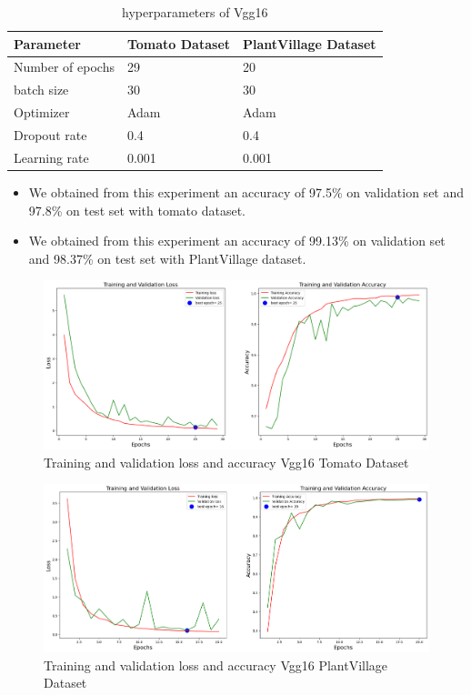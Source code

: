 \begin{table}[H]
\begin{tabular}{@{}|p{9cm}|p{3cm}|p{3cm}|@{}}
\hline
 \centering \textbf{Parameter} & \textbf{Tomato Dataset} & \textbf{PlantVillage Dataset} \\ \hline
 Number of epochs & 29  & 20 \\  \hline
 batch size & 30 & 30\\ \hline
 Optimizer & Adam & Adam\\ \hline
 Dropout rate & 0.4 & 0.4\\ \hline
 Learning rate & 0.001 & 0.001 \\ \hline
\end{tabular}
\caption{hyperparameters of Vgg16}
\end{table}
\begin{itemize}
    \item We obtained from this experiment an accuracy of 97.5\% on validation set and 97.8\% on test set with tomato dataset.
    \item We obtained from this experiment an accuracy of 99.13\% on validation set and 98.37\% on test set with PlantVillage dataset.
\end{itemize}
\begin{figure}[H]
    \centering
    \includegraphics[width=1\textwidth]{chapters/chapter04/fig04/tomato ds_VGG16.png}
    \caption{Training and validation loss and accuracy Vgg16 Tomato Dataset}
\end{figure}
\begin{figure}[H]
    \centering
    \includegraphics[width=1\textwidth]{chapters/chapter04/fig04/pv ds_VGG16.png}
    \caption{Training and validation loss and accuracy Vgg16 PlantVillage Dataset}
\end{figure}
